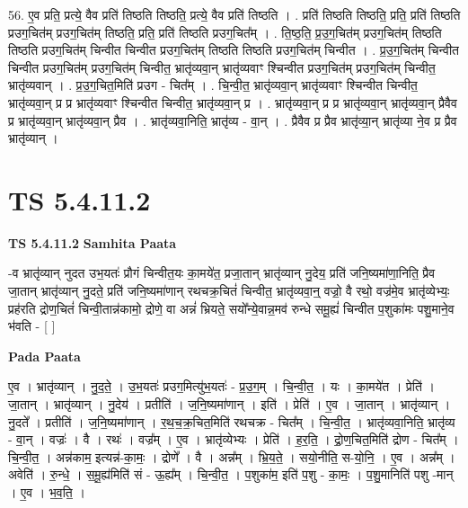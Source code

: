 \documentclass[17pt]{extarticle}
\begin{document}
56. ए॒व प्रति॒ प्रत्ये॒ वैव प्रति॑ तिष्ठति तिष्ठति॒ प्रत्ये॒ वैव प्रति॑ तिष्ठति । . प्रति॑ तिष्ठति तिष्ठति॒ प्रति॒ प्रति॑ तिष्ठति प्र‌उग॒चित॑म् प्र‌उग॒चित॑म् तिष्ठति॒ प्रति॒ प्रति॑ तिष्ठति प्र‌उग॒चित᳚म् । . ति॒ष्ठ॒ति॒ प्र॒उ॒ग॒चित॑म् प्र‌उग॒चित॑म् तिष्ठति तिष्ठति प्र‌उग॒चित॑म् चिन्वीत चिन्वीत प्र‌उग॒चित॑म् तिष्ठति तिष्ठति प्र‌उग॒चित॑म् चिन्वीत । . प्र॒उ॒ग॒चित॑म् चिन्वीत चिन्वीत प्र‌उग॒चित॑म् प्र‌उग॒चित॑म् चिन्वीत॒ भ्रातृ॑व्यवा॒न् भ्रातृ॑व्यवाꣳ श्चिन्वीत प्र‌उग॒चित॑म् प्र‌उग॒चित॑म् चिन्वीत॒ भ्रातृ॑व्यवान् । . प्र॒उ॒ग॒चित॒मिति॑ प्र‌उग - चित᳚म् । . चि॒न्वी॒त॒ भ्रातृ॑व्यवा॒न् भ्रातृ॑व्यवाꣳ श्चिन्वीत चिन्वीत॒ भ्रातृ॑व्यवा॒न् प्र प्र भ्रातृ॑व्यवाꣳ श्चिन्वीत चिन्वीत॒ भ्रातृ॑व्यवा॒न् प्र । . भ्रातृ॑व्यवा॒न् प्र प्र भ्रातृ॑व्यवा॒न् भ्रातृ॑व्यवा॒न् प्रैवैव प्र भ्रातृ॑व्यवा॒न् भ्रातृ॑व्यवा॒न् प्रैव । . भ्रातृ॑व्यवा॒निति॒ भ्रातृ॑व्य - वा॒न् । . प्रैवैव प्र प्रैव भ्रातृ॑व्या॒न् भ्रातृ॑व्या ने॒व प्र प्रैव भ्रातृ॑व्यान् । \newline
\pagebreak
{}

\section{ TS 5.4.11.2 }

\textbf{TS 5.4.11.2 } \newline
\textbf{Samhita Paata} \newline

-व भ्रातृ॑व्यान् नुदत उभ॒यतः॑ प्रौगं चिन्वीत॒यः का॒मये॑त॒ प्रजा॒तान् भ्रातृ॑व्यान् नु॒देय॒ प्रति॑ जनि॒ष्यमा॑णा॒निति॒ प्रैव जा॒तान् भ्रातृ॑व्यान् नु॒दते॒ प्रति॑ जनि॒ष्यमा॑णान् रथचक्र॒चितं॑ चिन्वीत॒ भ्रातृ॑व्यवा॒न्॒ वज्रो॒ वै रथो॒ वज्र॑मे॒व भ्रातृ॑व्येभ्यः॒ प्रह॑रति द्रोण॒चितं॑ चिन्वी॒तान्न॑कामो॒ द्रोणे॒ वा अन्नं॑ भ्रियते॒ सयो᳚न्ये॒वान्न॒मव॑ रुन्धे समू॒ह्यं॑ चिन्वीत प॒शुका॑मः पशु॒माने॒व भ॑वति - [  ] \newline

\textbf{Pada Paata} \newline

ए॒व । भ्रातृ॑व्यान् । नु॒द॒ते॒ । उ॒भ॒यतः॑ प्र‌उग॒मित्यु॑भ॒यतः॑ - प्र॒उ॒ग॒म् । चि॒न्वी॒त॒ । यः । का॒मये॑त । प्रेति॑ । जा॒तान् । भ्रातृ॑व्यान् । नु॒देय॑ । प्रतीति॑ । ज॒नि॒ष्यमा॑णान् । इति॑ । प्रेति॑ । ए॒व । जा॒तान् । भ्रातृ॑व्यान् । नु॒दते᳚ । प्रतीति॑ । ज॒नि॒ष्यमा॑णान् । र॒थ॒च॒क्र॒चित॒मिति॑ रथचक्र - चित᳚म् । चि॒न्वी॒त॒ । भ्रातृ॑व्यवा॒निति॒ भ्रातृ॑व्य - वा॒न् । वज्रः॑ । वै । रथः॑ । वज्र᳚म् । ए॒व । भ्रातृ॑व्येभ्यः । प्रेति॑ । ह॒र॒ति॒ । द्रो॒ण॒चित॒मिति॑ द्रोण - चित᳚म् । चि॒न्वी॒त॒ । अन्न॑काम॒ इत्यन्न॑-का॒मः॒ । द्रोणे᳚ । वै । अन्न᳚म् । भ्रि॒य॒ते॒ । सयो॒नीति॒ स-यो॒नि॒ । ए॒व । अन्न᳚म् । अवेति॑ । रु॒न्धे॒ । स॒मू॒ह्य॑मिति॑ सं - ऊ॒ह्य᳚म् । चि॒न्वी॒त॒ । प॒शुका॑म॒ इति॑ प॒शु - का॒मः॒ । प॒शु॒मानिति॑ पशु -मान् । ए॒व । भ॒व॒ति॒ ।  \newline
\end{document}
